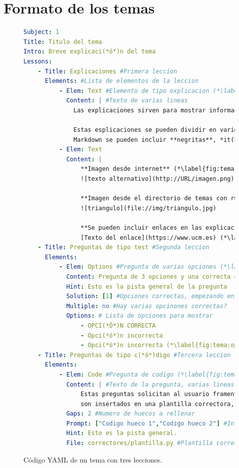 \documentclass[]{article}
\begin{document}
\section{Formato de los temas}
\begin{figure}[tbp]
\begin{lstlisting}[language=yaml,basicstyle=\ttfamily\footnotesize]
Subject: 1
Title: Titulo del tema
Intro: Breve explicaci(*ó*)n del tema
Lessons:
    - Title: Explicaciones #Primera leccion
      Elements: #Lista de elementos de la leccion
          - Elem: Text #Elemento de tipo explicacion (*\label{fig:tema:explicacion}*)
            Content: | #Texto de varias lineas
              Las explicaciones sirven para mostrar informaci(*ó*)n al alumno. (*\label{fig:tema:exp1}*)

              Estas esplicaciones se pueden dividir en varios p(*á*)rrafos, y con 
              Markdown se pueden incluir **negritas**, *it(*a*)licas* y `c(*ó*)digo`. (*\label{fig:tema:exp2}*)
          - Elem: Text
            Content: |
                **Imagen desde internet** (*\label{fig:tema:exp3}*)
                ![texto alternativo](http://URL/imagen.png)

                **Imagen desde el directorio de temas con ruta relativa**
                ![triangulo](file://img/triangulo.jpg)
  
                **Se pueden incluir enlaces en las explicaciones:**
                [Texto del enlace](https://www.ucm.es) (*\label{fig:tema:exp4}*)
    - Title: Preguntas de tipo test #Segunda leccion
      Elements:
          - Elem: Options #Pregunta de varias opciones (*\label{fig:tema:opt1}*)
            Content: Pregunta de 3 opciones y una correcta #Texto de la pregunta
            Hint: Esto es la pista general de la pregunta
            Solution: [1] #Opciones correctas, empezando en 1
            Multiple: no #Hay varias opcinones correctas?
            Options: # Lista de opciones para mostrar
                - OPCI(*Ó*)N CORRECTA
                - Opci(*ó*)n incorrecta
                - Opci(*ó*)n incorrecta (*\label{fig:tema:opt2}*)
    - Title: Preguntas de tipo c(*ó*)digo #Tercera leccion
      Elements:
          - Elem: Code #Pregunta de codigo (*\label{fig:tema:code1}*)
            Content: | #Texto de la pregunta, varias lineas
                Estas preguntas solicitan al usuario framentos de c(*ó*)digo que
                son insertados en una plantilla correctora, que es evaluada.
            Gaps: 2 #Numero de huecos a rellenar
            Prompt: ["Codigo hueco 1","Codigo hueco 2"] #Informacion de cada hueco
            Hint: Esto es la pista general. 
            File: correctores/plantilla.py #Plantilla correctora con 'huecos' (*\label{fig:tema:code2}*)
\end{lstlisting}
\caption{Código YAML de un tema con tres lecciones.\label{fig:tema}}
\end{figure}
\end{document}
